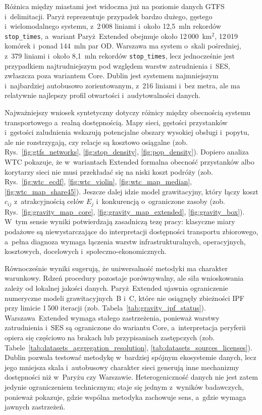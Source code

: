 \documentclass{pracamgr}
\begin{document}
Różnica między miastami jest widoczna już na poziomie danych \mbox{GTFS} i~delimitacji. Paryż reprezentuje przypadek bardzo dużego, gęstego i~wielomodalnego systemu, z~2\,008 liniami i~około 12{,}5~mln rekordów \texttt{stop\_times}, a~wariant \mbox{Paryż~Extended} obejmuje około 12\,000~km$^2$, 12\,019 komórek i~ponad 144~mln par \mbox{OD}. Warszawa ma system o~skali pośredniej, z~379 liniami i~około 8{,}1~mln rekordów \texttt{stop\_times}, lecz jednocześnie jest przypadkiem najtrudniejszym pod względem warstw zatrudnienia i~\mbox{SES}, zwłaszcza poza wariantem \mbox{Core}. Dublin jest systemem najmniejszym i~najbardziej autobusowo zorientowanym, z~216 liniami i~bez metra, ale ma relatywnie najlepszy profil otwartości i~audytowalności danych.

Najważniejszy wniosek syntetyczny dotyczy różnicy między obecnością systemu transportowego a~realną dostępnością. Mapy sieci, gęstości przystanków i~gęstości zaludnienia wskazują potencjalne obszary wysokiej obsługi i~popytu, ale nie rozstrzygają, czy relacje są kosztowo osiągalne (zob. Rys.~\ref{fig:gtfs_networks}, \ref{fig:stop_density}, \ref{fig:pop_density}). Dopiero analiza \mbox{WTC} pokazuje, że w~wariantach \mbox{Extended} formalna obecność przystanków albo korytarzy sieci nie musi przekładać się na niski koszt podróży (zob. Rys.~\ref{fig:wtc_ecdf}, \ref{fig:wtc_violin}, \ref{fig:wtc_map_median}, \ref{fig:wtc_map_share45}). Jeszcze dalej idzie model grawitacyjny, który łączy koszt $c_{ij}$ z~atrakcyjnością celów $E_j$ i~konkurencją o~ograniczone zasoby (zob. Rys.~\ref{fig:gravity_map_core}, \ref{fig:gravity_map_extended}, \ref{fig:gravity_box}). W~tym sensie wyniki potwierdzają zasadniczą tezę pracy: klasyczne miary podażowe są niewystarczające do interpretacji dostępności transportu zbiorowego, a~pełna diagnoza wymaga łączenia warstw infrastrukturalnych, operacyjnych, kosztowych, docelowych i~społeczno-ekonomicznych.

Równocześnie wyniki sugerują, że uniwersalność metodyki ma charakter warunkowy. Rdzeń procedury pozostaje porównywalny, ale siła wnioskowania zależy od lokalnej jakości danych. \mbox{Paryż~Extended} ujawnia ograniczenie numeryczne modeli grawitacyjnych~B i~C, które nie osiągnęły zbieżności \mbox{IPF} przy limicie 1\,500 iteracji (zob. Tabela~\ref{tab:gravity_ipf_status}). \mbox{Warszawa~Extended} wymaga stałego zastrzeżenia, ponieważ warstwy zatrudnienia i~\mbox{SES} są ograniczone do wariantu \mbox{Core}, a~interpretacja peryferii opiera się częściowo na brakach lub przypisaniach zastępczych (zob. Tabele~\ref{tab:datasets_aggregation_resolution}, \ref{tab:datasets_sources_licenses}). Dublin pozwala testować metodykę w~bardziej spójnym ekosystemie danych, lecz jego mniejsza skala i~autobusowy charakter sieci generują inne mechanizmy dostępności niż w~Paryżu czy Warszawie. Heterogeniczność danych nie jest zatem jedynie ograniczeniem technicznym; staje się jednym z~wyników badawczych, ponieważ pokazuje, gdzie wspólna metodyka zachowuje sens, a~gdzie wymaga jawnych zastrzeżeń.
\end{document}

